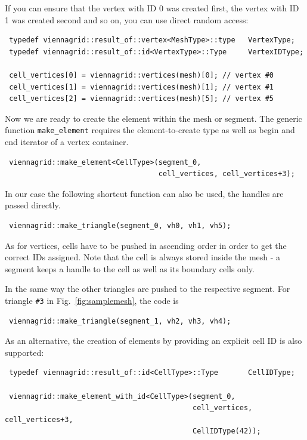 If you can ensure that the vertex with ID 0 was created first, the vertex with ID 1 was created second and so on, you can use direct random access:
\begin{lstlisting}
 typedef viennagrid::result_of::vertex<MeshType>::type   VertexType;
 typedef viennagrid::result_of::id<VertexType>::Type     VertexIDType;

 cell_vertices[0] = viennagrid::vertices(mesh)[0]; // vertex #0
 cell_vertices[1] = viennagrid::vertices(mesh)[1]; // vertex #1
 cell_vertices[2] = viennagrid::vertices(mesh)[5]; // vertex #5
\end{lstlisting}

Now we are ready to create the element within the mesh or segment. The generic function \lstinline|make_element| requires the element-to-create type as well as begin and end iterator of a vertex container.

\begin{lstlisting}
 viennagrid::make_element<CellType>(segment_0,
                                    cell_vertices, cell_vertices+3);
\end{lstlisting}

In our case the following shortcut function can also be used, the handles are passed directly.
\begin{lstlisting}
 viennagrid::make_triangle(segment_0, vh0, vh1, vh5);
\end{lstlisting}

As for vertices, cells have to be pushed in ascending order in order to get the correct IDs assigned. Note that the cell is always stored inside the mesh - a segment keeps a handle to the cell as well as its boundary cells only.

In the same way the other triangles are pushed to the respective segment. For triangle \lstinline|#3| in Fig.~\ref{fig:samplemesh}, the code is
\begin{lstlisting}
 viennagrid::make_triangle(segment_1, vh2, vh3, vh4);
\end{lstlisting}

As an alternative, the creation of elements by providing an explicit cell ID is also supported:

\begin{lstlisting}
 typedef viennagrid::result_of::id<CellType>::Type       CellIDType;

 viennagrid::make_element_with_id<CellType>(segment_0,
                                            cell_vertices, cell_vertices+3,
                                            CellIDType(42));
\end{lstlisting}
